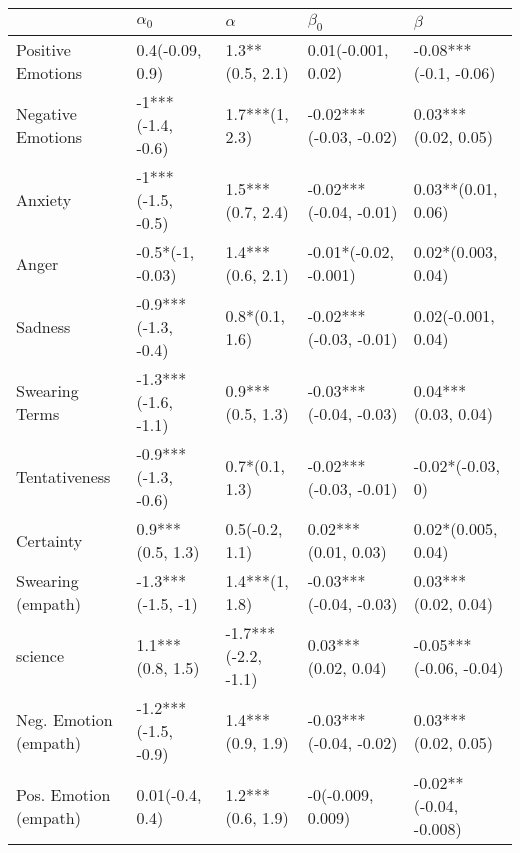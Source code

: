 \begin{tabular}{lllll}
\toprule
{} &           $\alpha_0$ &             $\alpha$ &               $\beta_0$ &                 $\beta$ \\
\midrule
Positive Emotions     &      0.4(-0.09, 0.9) &      1.3**(0.5, 2.1) &      0.01(-0.001, 0.02) &   -0.08***(-0.1, -0.06) \\
Negative Emotions     &    -1***(-1.4, -0.6) &       1.7***(1, 2.3) &  -0.02***(-0.03, -0.02) &     0.03***(0.02, 0.05) \\
Anxiety               &    -1***(-1.5, -0.5) &     1.5***(0.7, 2.4) &  -0.02***(-0.04, -0.01) &      0.03**(0.01, 0.06) \\
Anger                 &     -0.5*(-1, -0.03) &     1.4***(0.6, 2.1) &   -0.01*(-0.02, -0.001) &      0.02*(0.003, 0.04) \\
Sadness               &  -0.9***(-1.3, -0.4) &       0.8*(0.1, 1.6) &  -0.02***(-0.03, -0.01) &      0.02(-0.001, 0.04) \\
Swearing Terms        &  -1.3***(-1.6, -1.1) &     0.9***(0.5, 1.3) &  -0.03***(-0.04, -0.03) &     0.04***(0.03, 0.04) \\
Tentativeness         &  -0.9***(-1.3, -0.6) &       0.7*(0.1, 1.3) &  -0.02***(-0.03, -0.01) &        -0.02*(-0.03, 0) \\
Certainty             &     0.9***(0.5, 1.3) &       0.5(-0.2, 1.1) &     0.02***(0.01, 0.03) &      0.02*(0.005, 0.04) \\
Swearing (empath)     &    -1.3***(-1.5, -1) &       1.4***(1, 1.8) &  -0.03***(-0.04, -0.03) &     0.03***(0.02, 0.04) \\
science               &     1.1***(0.8, 1.5) &  -1.7***(-2.2, -1.1) &     0.03***(0.02, 0.04) &  -0.05***(-0.06, -0.04) \\
Neg. Emotion (empath) &  -1.2***(-1.5, -0.9) &     1.4***(0.9, 1.9) &  -0.03***(-0.04, -0.02) &     0.03***(0.02, 0.05) \\
Pos. Emotion (empath) &      0.01(-0.4, 0.4) &     1.2***(0.6, 1.9) &       -0(-0.009, 0.009) &  -0.02**(-0.04, -0.008) \\
\bottomrule
\end{tabular}

